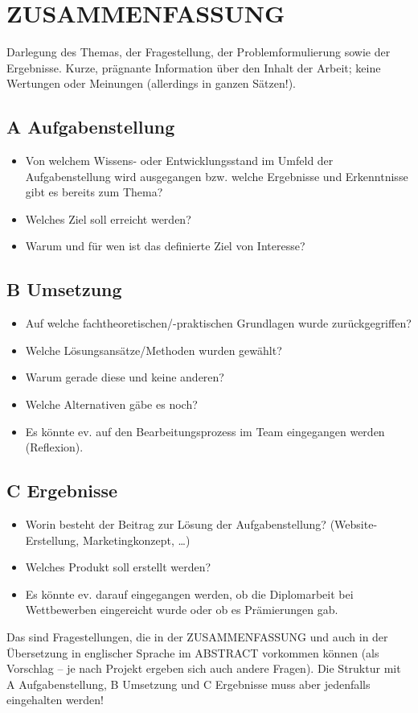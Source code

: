 \section*{ZUSAMMENFASSUNG}
Darlegung des Themas, der Fragestellung, der Problemformulierung sowie der Ergebnisse.
Kurze, prägnante Information über den Inhalt der Arbeit; keine Wertungen oder Meinungen (allerdings in ganzen Sätzen!).

\subsection*{A Aufgabenstellung}
\begin{itemize}
	\item Von welchem Wissens- oder Entwicklungsstand im Umfeld der Aufgabenstellung wird ausgegangen bzw. welche Ergebnisse und Erkenntnisse gibt es bereits zum Thema?
	\item Welches Ziel soll erreicht werden?
	\item Warum und für wen ist das definierte Ziel von Interesse?
\end{itemize}

\subsection*{B Umsetzung}
\begin{itemize}
	\item Auf welche fachtheoretischen/-praktischen Grundlagen wurde zurückgegriffen?
	\item Welche Lösungsansätze/Methoden wurden gewählt?
	\item Warum gerade diese und keine anderen?
	\item Welche Alternativen gäbe es noch?
	\item Es könnte ev. auf den Bearbeitungsprozess im Team eingegangen werden (Reflexion).
\end{itemize}

\subsection*{C Ergebnisse}
\begin{itemize}
	\item Worin besteht der Beitrag zur Lösung der Aufgabenstellung? (Website-Erstellung, Marketingkonzept, …)
	\item Welches Produkt soll erstellt werden?
	\item Es könnte ev. darauf eingegangen werden, ob die Diplomarbeit bei Wettbewerben eingereicht wurde oder ob es Prämierungen gab.
\end{itemize}


Das sind Fragestellungen, die in der ZUSAMMENFASSUNG und auch in der Übersetzung in englischer Sprache im ABSTRACT vorkommen können (als Vorschlag – je nach Projekt ergeben sich auch andere Fragen).
Die Struktur mit A Aufgabenstellung, B Umsetzung und C Ergebnisse muss aber jedenfalls eingehalten werden!
